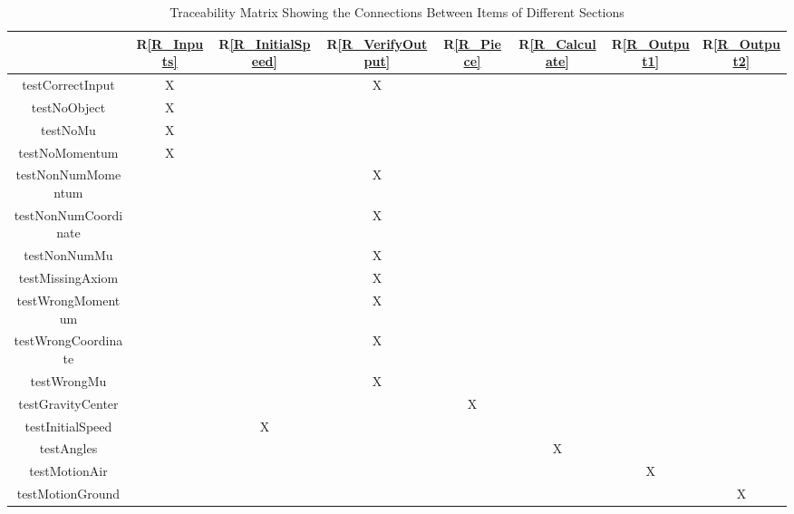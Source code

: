 \documentclass[12pt, titlepage]{article}
\newcommand{\rref}[1]{R\ref{#1}}
\begin{document}
\begin{table}[h!]
	\centering
	\begin{tabular}{|c|c|c|c|c|c|c|c|}
		\hline        
		& \rref{R_Inputs} & \rref{R_InitialSpeed} & \rref{R_VerifyOutput}& \rref{R_Piece} &\rref{R_Calculate} & \rref{R_Output1}&\rref{R_Output2} \\
		\hline
		testCorrectInput &X & &X & & & &\\ \hline
		testNoObject &X & & & & & &\\ \hline
		testNoMu &X & & & & & &\\ \hline
		testNoMomentum &X & & & & & &\\ \hline
		testNonNumMomentum & & &X & & & &\\ \hline
		testNonNumCoordinate & & &X & & & &\\ \hline
		testNonNumMu & & &X & & & &\\ \hline
		testMissingAxiom & & &X & & & &\\ \hline
		testWrongMomentum & & &X & & & &\\ \hline
		testWrongCoordinate & & &X & & & &\\ \hline
		testWrongMu & & &X & & & &\\ \hline
		testGravityCenter & & & &X & & &\\ \hline
		testInitialSpeed & &X & & & & &\\ \hline
		testAngles & & & & &X & &\\ \hline
		testMotionAir & & & & & &X &\\ \hline
		testMotionGround & & & & & & &X\\ \hline
	\end{tabular}
	\caption{Traceability Matrix Showing the Connections Between Items of Different Sections}
	\label{Table:trace}
\end{table}

\newpage

		
\end{document}

